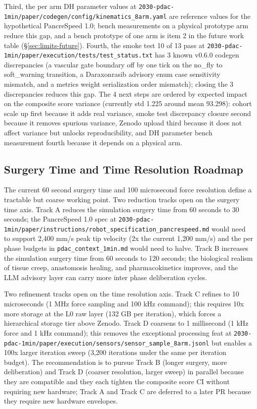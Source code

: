 Third, the per arm DH parameter values at
\texttt{2030-pdac-1min/paper/codegen/config/kinematics_8arm.yaml}
are reference values for the hypothetical PancreSpeed 1.0; bench
measurements on a physical prototype arm reduce this gap, and a
bench prototype of one arm is item 2 in the future work table
(\S \ref{sec:limits-future}). Fourth, the smoke test 10 of 13
pass at \texttt{2030-pdac-1min/paper/execution/tests/test_status.txt}
has 3 known v0.6.0 codegen discrepancies (a vascular gate
boundary off by one tick on the no_fly to soft_warning transition,
a Daraxonrasib advisory enum case sensitivity mismatch, and a
metrics weight serialization order mismatch); closing the 3
discrepancies reduces this gap. The 4 next steps are ordered by
expected impact on the composite score variance (currently std
1.225 around mean 93.298): cohort scale up first because it adds
real variance, smoke test discrepancy closure second because it
removes spurious variance, Zenodo upload third because it does
not affect variance but unlocks reproducibility, and DH parameter
bench measurement fourth because it depends on a physical arm.

\subsection{Surgery Time and Time Resolution Roadmap}
\label{sec:limits-resolution}

The current 60 second surgery time and 100 microsecond force
resolution define a tractable but coarse working point. Two
reduction tracks open on the surgery time axis. Track A reduces
the simulation surgery time from 60 seconds to 30 seconds; the
PancreSpeed 1.0 spec at
\texttt{2030-pdac-1min/paper/instructions/robot_specification_pancrespeed.md}
would need to support 2,400 mm/s peak tip velocity (2x the current
1,200 mm/s) and the per phase budgets in
\texttt{pdac_context_1min.md} would need to halve. Track B
increases the simulation surgery time from 60 seconds to 120
seconds; the biological realism of tissue creep, anastomosis
healing, and pharmacokinetics improves, and the LLM advisory layer
can carry more inter phase deliberation cycles.

Two refinement tracks open on the time resolution axis. Track C
refines to 10 microseconds (1 MHz force sampling and 100 kHz
command); this requires 10x more storage at the L0 raw layer
(132 GB per iteration), which forces a hierarchical storage tier
above Zenodo. Track D coarsens to 1 millisecond (1 kHz force and
1 kHz command); this removes the exceptional processing feat at
\texttt{2030-pdac-1min/paper/execution/sensors/sensor_sample_8arm.jsonl}
but enables a 100x larger iteration sweep (3,200 iterations under
the same per iteration budget). The recommendation is to pursue
Track B (longer surgery, more deliberation) and Track D (coarser
resolution, larger sweep) in parallel because they are compatible
and they each tighten the composite score CI without requiring
new hardware; Track A and Track C are deferred to a later PR
because they require new hardware envelopes.

